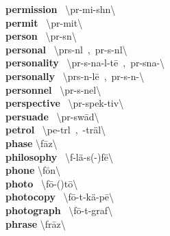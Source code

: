 \documentclass[10pt,a4paper]{article}
\begin{document}
\begin{multicols}{2}
\textbf{ permission }\quad \ \textbackslash p\textschwa r-\textprimstress mi-sh\textschwa n\textbackslash \\
\textbf{ permit }\quad \ \textbackslash p\textschwa r-\textprimstress mit\textbackslash \\
\textbf{ person }\quad \ \textbackslash \textprimstress p\textschwa r-s\textsuperscript{\textreve}n\textbackslash \\
\textbf{ personal }\quad \ \textbackslash \textprimstress p\textschwa rs-n\textschwa l\ ,\ \textprimstress p\textschwa r-s\textschwa -n\textschwa l\textbackslash \\
\textbf{ personality }\quad \ \textbackslash \textsecstress p\textschwa r-s\textschwa -\textprimstress na-l\textschwa -t\={e}\ ,\ \textsecstress p\textschwa r-\textprimstress sna-\textbackslash \\
\textbf{ personally }\quad \ \textbackslash \textprimstress p\textschwa rs-n\textschwa -l\={e}\ ,\ \textprimstress p\textschwa r-s\textschwa -n\textschwa -\textbackslash \\
\textbf{ personnel }\quad \ \textbackslash \textsecstress p\textschwa r-s\textschwa -\textprimstress nel\textbackslash \\
\textbf{ perspective }\quad \ \textbackslash p\textschwa r-\textprimstress spek-tiv\textbackslash \\
\textbf{ persuade }\quad \ \textbackslash p\textschwa r-\textprimstress sw\={a}d\textbackslash \\
\textbf{ petrol }\quad \ \textbackslash \textprimstress pe-tr\textschwa l\ ,\ -\textsecstress tr\"{a}l\textbackslash \\
\textbf{ phase }\quad \textbackslash \textprimstress f\={a}z\textbackslash \\
\textbf{ philosophy }\quad \ \textbackslash f\textschwa -\textprimstress l\"{a}-s(\textschwa -)f\={e}\textbackslash \\
\textbf{ phone }\quad \textbackslash \textprimstress f\={o}n\textbackslash \\
\textbf{ photo }\quad \ \textbackslash \textprimstress f\={o}-(\textsecstress )t\={o}\textbackslash \\
\textbf{ photocopy }\quad \ \textbackslash \textprimstress f\={o}-t\textschwa -\textsecstress k\"{a}-p\={e}\textbackslash \\
\textbf{ photograph }\quad \ \textbackslash \textprimstress f\={o}-t\textschwa -\textsecstress graf\textbackslash \\
\textbf{ phrase }\quad \textbackslash \textprimstress fr\={a}z\textbackslash \\

\end{multicols}
\end{document}
